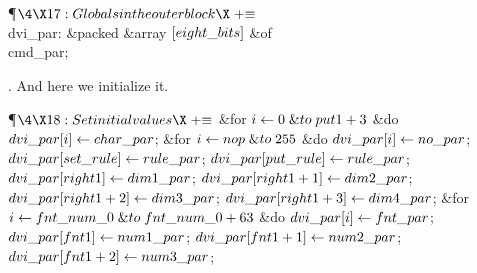\Y\P$\4\X17:Globals in the outer block\X\mathrel{+}\S$\6
\4\\{dvi\_par}: \&{packed} \&{array} $[\\{eight\_bits}]$ \1\&{of}\5
\\{cmd\_par};\2\par
\fi

. And here we initialize it.

\Y\P$\4\X18:Set initial values\X\mathrel{+}\S$\6
\&{for} $\hbox{$i$}\gets0\mathrel{\&{to}}\\{put1}+3$ \1\&{do}\5
$\\{dvi\_par}[\hbox{$i$}]\gets\\{char\_par}$;\2\6
\&{for} $\hbox{$i$}\gets\\{nop}\mathrel{\&{to}}255$ \1\&{do}\5
$\\{dvi\_par}[\hbox{$i$}]\gets\\{no\_par}$;\2\6
$\\{dvi\_par}[\\{set\_rule}]\gets\\{rule\_par}$;\5
$\\{dvi\_par}[\\{put\_rule}]\gets\\{rule\_par}$;\6
$\\{dvi\_par}[\\{right1}]\gets\\{dim1\_par}$;\5
$\\{dvi\_par}[\\{right1}+1]\gets\\{dim2\_par}$;\5
$\\{dvi\_par}[\\{right1}+2]\gets\\{dim3\_par}$;\5
$\\{dvi\_par}[\\{right1}+3]\gets\\{dim4\_par}$;\6
\&{for} $\hbox{$i$}\gets\\{fnt\_num\_0}\mathrel{\&{to}}\\{fnt\_num\_0}+63$ \1\&{do}\5
$\\{dvi\_par}[\hbox{$i$}]\gets\\{fnt\_par}$;\2\6
$\\{dvi\_par}[\\{fnt1}]\gets\\{num1\_par}$;\5
$\\{dvi\_par}[\\{fnt1}+1]\gets\\{num2\_par}$;\5
$\\{dvi\_par}[\\{fnt1}+2]\gets\\{num3\_par}$;\5
